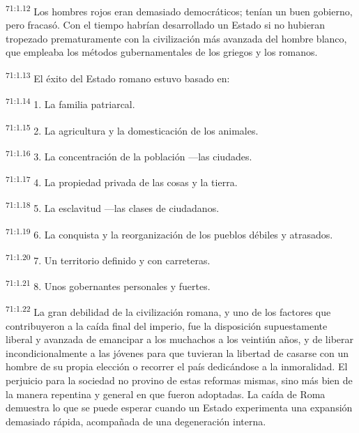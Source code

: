 \documentclass[twoside, 11pt]{book}
\begin{document}
\par
\textsuperscript{71:1.12} Los hombres rojos eran demasiado democráticos; tenían un buen gobierno, pero fracasó. Con el tiempo habrían desarrollado un Estado si no hubieran tropezado prematuramente con la civilización más avanzada del hombre blanco, que empleaba los métodos gubernamentales de los griegos y los romanos.

\par
\textsuperscript{71:1.13} El éxito del Estado romano estuvo basado en:

\par
\textsuperscript{71:1.14} 1. La familia patriarcal.

\par
\textsuperscript{71:1.15} 2. La agricultura y la domesticación de los animales.

\par
\textsuperscript{71:1.16} 3. La concentración de la población ---las ciudades.

\par
\textsuperscript{71:1.17} 4. La propiedad privada de las cosas y la tierra.

\par
\textsuperscript{71:1.18} 5. La esclavitud ---las clases de ciudadanos.

\par
\textsuperscript{71:1.19} 6. La conquista y la reorganización de los pueblos débiles y atrasados.

\par
\textsuperscript{71:1.20} 7. Un territorio definido y con carreteras.

\par
\textsuperscript{71:1.21} 8. Unos gobernantes personales y fuertes.

\par
\textsuperscript{71:1.22} La gran debilidad de la civilización romana, y uno de los factores que contribuyeron a la caída final del imperio, fue la disposición supuestamente liberal y avanzada de emancipar a los muchachos a los veintiún años, y de liberar incondicionalmente a las jóvenes para que tuvieran la libertad de casarse con un hombre de su propia elección o recorrer el país dedicándose a la inmoralidad. El perjuicio para la sociedad no provino de estas reformas mismas, sino más bien de la manera repentina y general en que fueron adoptadas. La caída de Roma demuestra lo que se puede esperar cuando un Estado experimenta una expansión demasiado rápida, acompañada de una degeneración interna.
\end{document}
